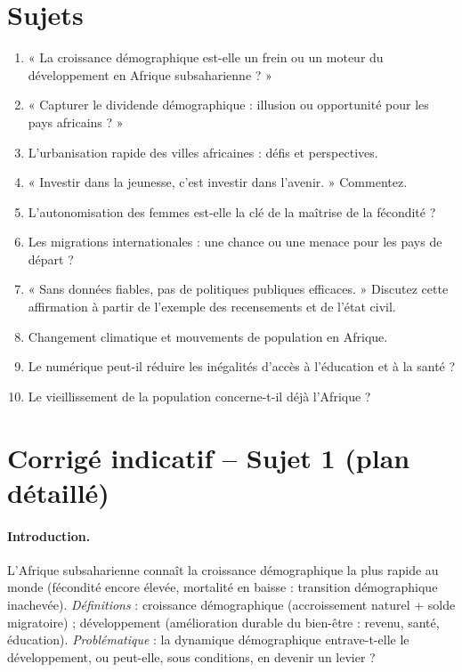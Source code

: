 \documentclass[11pt,a4paper]{article}
\begin{document}
\section*{Sujets}
\begin{enumerate}[label=\textbf{Sujet \arabic*.}, leftmargin=*]
  \item « La croissance démographique est-elle un frein ou un moteur du développement en Afrique subsaharienne ? »
  \item « Capturer le dividende démographique : illusion ou opportunité pour les pays africains ? »
  \item L'urbanisation rapide des villes africaines : défis et perspectives.
  \item « Investir dans la jeunesse, c'est investir dans l'avenir. » Commentez.
  \item L'autonomisation des femmes est-elle la clé de la maîtrise de la fécondité ?
  \item Les migrations internationales : une chance ou une menace pour les pays de départ ?
  \item « Sans données fiables, pas de politiques publiques efficaces. » Discutez cette affirmation à partir de l'exemple des recensements et de l'état civil.
  \item Changement climatique et mouvements de population en Afrique.
  \item Le numérique peut-il réduire les inégalités d'accès à l'éducation et à la santé ?
  \item Le vieillissement de la population concerne-t-il déjà l'Afrique ?
\end{enumerate}

\newpage
\section*{Corrigé indicatif -- Sujet 1 (plan détaillé)}

\paragraph{Introduction.}
L'Afrique subsaharienne connaît la croissance démographique la plus rapide au monde
(fécondité encore élevée, mortalité en baisse : transition démographique inachevée).
\emph{Définitions} : croissance démographique (accroissement naturel + solde migratoire) ;
développement (amélioration durable du bien-être : revenu, santé, éducation).
\emph{Problématique} : la dynamique démographique entrave-t-elle le développement, ou peut-elle,
sous conditions, en devenir un levier ?
\end{document}
